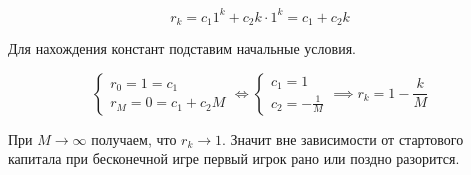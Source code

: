 \begin{equation*}
  r_k
  = c_1 1^k + c_2 k \cdot 1^k
  = c_1 + c_2 k
\end{equation*}

Для нахождения констант подставим начальные условия.

\begin{equation*}
  \begin{cases}
    r_0 = 1 = c_1 \\
    r_M = 0 = c_1 + c_2 M
  \end{cases}
  \iff
  \begin{cases}
    c_1 = 1 \\
    c_2 = -\frac{1}{M}
  \end{cases}
  \implies
  r_k = 1 - \frac{k}{M}
\end{equation*}

При \(M \to \infty\) получаем, что \(r_k \to 1\). Значит вне зависимости от
стартового капитала при бесконечной игре первый игрок рано или поздно разорится.
